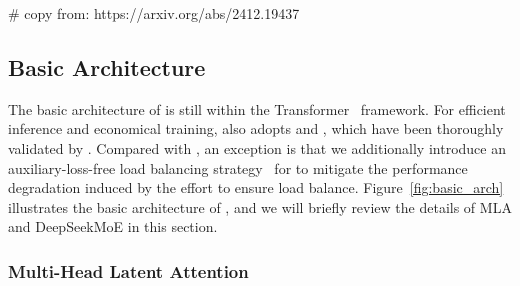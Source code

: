 # copy from: https://arxiv.org/abs/2412.19437

\subsection{Basic Architecture}

The basic architecture of \dsviii{} is still within the Transformer~\citep{transformer} framework. 
For efficient inference and economical training, \dsviii{} also adopts \dsattn{} and \dsmoe{}, which have been thoroughly validated by \dsvii{}. 
Compared with \dsvii{}, an exception is that we additionally introduce an auxiliary-loss-free load balancing strategy~\citep{noaux_tc} for \dsmoe{} to mitigate the performance degradation induced by the effort to ensure load balance. 
Figure~\ref{fig:basic_arch} illustrates the basic architecture of \dsviii{}, and we will briefly review the details of MLA and DeepSeekMoE in this section. 

\subsubsection{Multi-Head Latent Attention}

